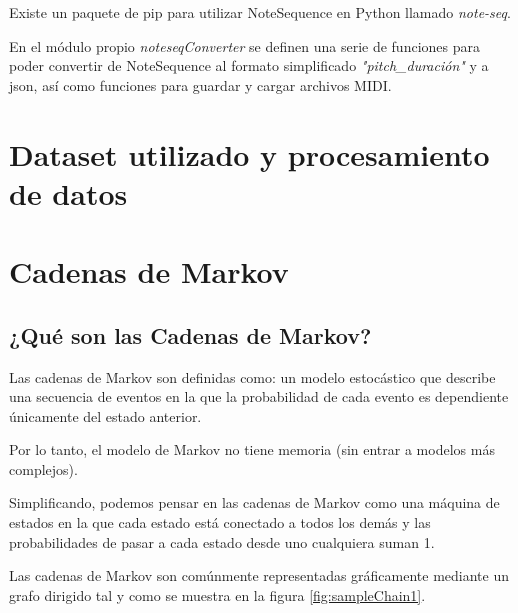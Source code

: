     Existe un paquete de pip para utilizar NoteSequence en Python llamado \textit{note-seq}.

    En el módulo propio \textit{noteseqConverter} se definen una serie de funciones para poder convertir de NoteSequence al formato simplificado \textit{"pitch\_duración"} y a json, así como funciones para guardar y cargar archivos MIDI.

\section{Dataset utilizado y procesamiento de datos}
\label{sec:dataset}

\section{Cadenas de Markov}
\label{sec:markov-chain}

    \subsection{¿Qué son las Cadenas de Markov?}
    \label{subsec:definicionCadenasMarkov}
    Las cadenas de Markov son definidas como: un modelo estocástico que describe una secuencia de eventos en la que la probabilidad de cada evento es dependiente únicamente del estado anterior.

    Por lo tanto, el modelo de Markov no tiene memoria (sin entrar a modelos más complejos).

    Simplificando, podemos pensar en las cadenas de Markov como una máquina de estados en la que cada estado está conectado a todos los demás y las probabilidades de pasar a cada estado desde uno cualquiera suman 1.

    Las cadenas de Markov son comúnmente representadas gráficamente mediante un grafo dirigido tal y como se muestra en la figura \ref{fig:sampleChain1}.

